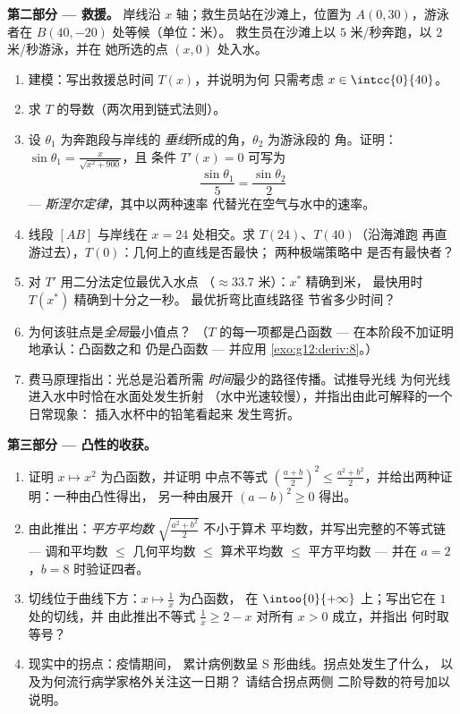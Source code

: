 \begin{problem}
\medskip
\noindent\textbf{第二部分 --- 救援。}
岸线沿 $x$ 轴；救生员站在沙滩上，位置为
$A(0, 30)$，游泳者在 $B(40, -20)$ 处等候（单位：米）。
救生员在沙滩上以 $5$ 米/秒奔跑，以 $2$ 米/秒游泳，并在
她所选的点 $(x, 0)$ 处入水。
\begin{enumerate}[resume]
  \item 建模：写出救援总时间 $T(x)$，并说明为何
        只需考虑 $x \in \intcc{0}{40}$。
  \item 求 $T$ 的导数（两次用到链式法则）。
  \item 设 $\theta_1$ 为奔跑段与岸线的
        \emph{垂线}所成的角，$\theta_2$ 为游泳段的
        角。证明：
        $\sin\theta_1 = \frac{x}{\sqrt{x^2 + 900}}$，且
        条件 $T'(x) = 0$ 可写为
        \[
        \frac{\sin\theta_1}{5} = \frac{\sin\theta_2}{2}
        \]
        --- \emph{斯涅尔定律}，其中以两种速率
        代替光在空气与水中的速率。
  \item 线段 $[AB]$ 与岸线在
        $x = 24$ 处相交。求 $T(24)$、$T(40)$（沿海滩跑
        再直游过去），$T(0)$：几何上的直线是否最快；
        两种极端策略中
        是否有最快者？
  \item 对 $T'$ 用二分法定位最优入水点
        （$\approx 33.7$ 米）：$x^*$ 精确到米，
        最快用时 $T(x^*)$ 精确到十分之一秒。
        最优折弯比直线路径
        节省多少时间？
  \item 为何该驻点是\emph{全局}最小值点？
        （$T$ 的每一项都是凸函数 --- 在本阶段不加证明地承认：凸函数之和
        仍是凸函数 --- 并应用
        \cref{exo:g12:deriv:8}。）
  \item 费马原理指出：光总是沿着所需
        \emph{时间}最少的路径传播。试推导光线
        为何光线进入水中时恰在水面处发生折射
        （水中光速较慢），并指出由此可解释的一个日常现象：
        插入水杯中的铅笔看起来
        发生弯折。
\end{enumerate}

\medskip
\noindent\textbf{第三部分 --- 凸性的收获。}
\begin{enumerate}[resume]
  \item 证明 $x \mapsto x^2$ 为凸函数，并证明
        中点不等式
        $\left(\frac{a + b}{2}\right)^2 \leq
        \frac{a^2 + b^2}{2}$，并给出两种证明：一种由凸性得出，
        另一种由展开 $(a - b)^2 \geq 0$ 得出。
  \item 由此推出：\emph{平方平均数}
        $\sqrt{\frac{a^2 + b^2}{2}}$ 不小于算术
        平均数，并写出完整的不等式链 ---
        调和平均数 $\leq$ 几何平均数 $\leq$ 算术平均数 $\leq$
        平方平均数 --- 并在 $a = 2$，$b = 8$ 时验证四者。
  \item 切线位于曲线下方：$x \mapsto \frac1x$ 为凸函数，
        在 $\intoo{0}{+\infty}$ 上；写出它在 $1$ 处的切线，并
        由此推出不等式
        $\frac1x \geq 2 - x$ 对所有 $x > 0$ 成立，并指出
        何时取等号？
  \item 现实中的拐点：疫情期间，
        累计病例数呈 S 形曲线。拐点处发生了什么，
        以及为何流行病学家格外关注这一日期？
        请结合拐点两侧
        二阶导数的符号加以说明。
\end{enumerate}


\end{problem}
